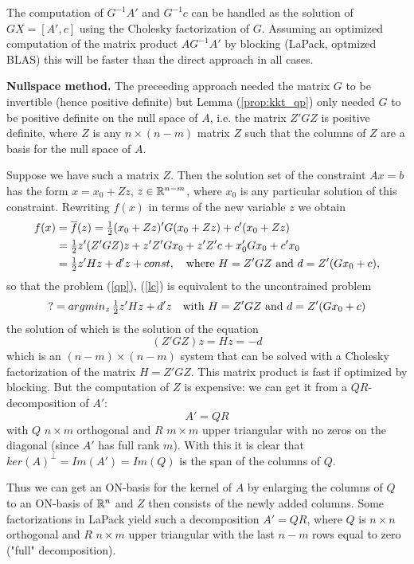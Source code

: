 The computation of $G^{-1}A'$ and $G^{-1}c$ can be handled as the solution of
$GX=[A',c]$ using the Cholesky factorization of $G$. Assuming an optimized 
computation of the matrix product $AG^{-1}A'$ by blocking (LaPack, optmized 
BLAS) this will be faster than the direct approach in all cases.

\noindent
\textbf{Nullspace method.} The preceeding approach needed the matrix $G$ to be
invertible (hence positive definite) but Lemma (\ref{prop:kkt_qp}) only needed 
$G$ to be positive definite on the null space of $A$, i.e. the matrix 
$Z'GZ$ is positive definite, where $Z$ is any $n\times(n-m)$ matrix $Z$ such 
that the columns of $Z$ are a basis for the null space of $A$.

Suppose we have such a matrix $Z$. Then the solution set of the constraint
$Ax=b$ has the form $x=x_0+Zz$, $z\in{\mathbb R}^{n-m}$, where $x_0$ is any particular
solution of this constraint. Rewriting $f(x)$ in terms of the new variable $z$
we obtain
%
\begin{align*}
f(x)&=\overline f(z)=
\tfrac{1}{2}(x_0+Zz)'G(x_0+Zz)+c'(x_0+Zz)\\&=
\tfrac{1}{2}z'(Z'GZ)z+z'Z'Gx_0+z'Z'c+x_0'Gx_0+c'x_0\\&=
\tfrac{1}{2}z'Hz+d'z+const,
\quad\text{where }H=Z'GZ\text{ and }d=Z'(Gx_0+c),
\end{align*}
%
so that the problem (\ref{qp}), (\ref{lc}) is equivalent to the uncontrained problem
%
\begin{equation}
\label{nspace_qp}
? = argmin_z\thinspace\tfrac{1}{2}z'Hz+d'z\quad\text{with }H=Z'GZ\text{ and }d=Z'(Gx_0+c)
\end{equation}
%
the solution of which is the solution of the equation
%
\begin{equation}
\label{nspace_qp_sol}
(Z'GZ)z=Hz=-d
\end{equation}
%
which is an $(n-m)\times(n-m)$ system that can be solved with a Cholesky 
factorization of the matrix $H=Z'GZ$. This matrix product is fast if optimized by
blocking. But the computation of $Z$ is expensive: we can get it from a 
$QR$-decomposition of $A'$:
$$
A' = QR
$$
with $Q$ $n\times m$ orthogonal and $R$ $m\times m$ upper triangular with no 
zeros on the diagonal (since $A'$ has full rank $m$). With this
it is clear that $ker(A)^\perp = Im(A') = Im(Q)$ is the span of the columns of 
$Q$. 

Thus we can get an ON-basis for the kernel of $A$ by enlarging the columns of 
$Q$ to an ON-basis of ${\mathbb R}^n$ and $Z$ then consists of the newly added columns.
Some factorizations in LaPack yield such a decomposition
$A'=QR$, where $Q$ is $n\times n$ orthogonal and $R$ $n\times m$ upper 
triangular with the last $n-m$ rows equal to zero ("full" decomposition).

